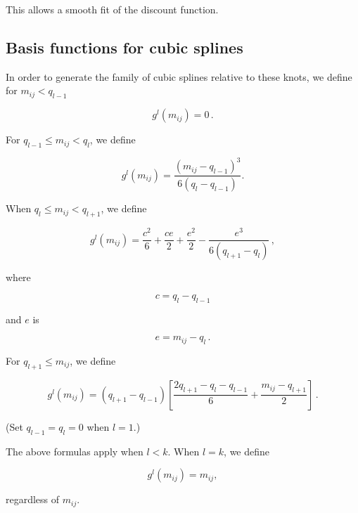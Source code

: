 This allows a smooth fit of the discount function.

\subsection{Basis functions for cubic splines}

In order to generate the family of cubic splines relative to these knots, we define for $m_{ij}<q_{l-1}$

\begin{equation*}
  \label{eq:A.2}
  g^l(m_{ij})=0\,.
\end{equation*}


For $q_{l-1}\leq m_{ij} <q_l$, we define

\begin{equation*}
  \label{eq:A.3}
  g^l(m_{ij})=\frac{(m_{ij}-q_{l-1})^3}{6(q_l-q_{l-1})}.
\end{equation*}

When $q_l\leq m_{ij}< q_{l+1}$, we define

\begin{equation*}
  \label{eq:A.4a}
  g^l(m_{ij}) = \frac{c^2}{6}+\frac{ce}{2}+\frac{e^2}{2}-\frac{e^3}{6(q_{l+1}-q_l)}\,,
\end{equation*}

where

\begin{equation*}
  \label{eq:A.4b}
  c = q_l-q_{l-1}
\end{equation*}

and $e$ is

\begin{equation*}
  \label{eq:A.4c}
  e = m_{ij}-q_l\,.
\end{equation*}

For $q_{l+1}\leq m_{ij}$, we define

\begin{equation*}
  \label{eq:A.5}
  g^l(m_{ij}) = (q_{l+1}-q_{l-1})\left[\frac{2q_{l+1}-q_l-q_{l-1}}{6}+\frac{m_{ij}-q_{l+1}}{2}\right]\,.
\end{equation*}

(Set $q_{l-1}=q_l=0$ when $l=1$.)

The above formulas apply when $l<k$. When $l=k$, we define

\begin{equation*}
  \label{eq:A.6}
 g^l(m_{ij})= m_{ij},
\end{equation*}

regardless of $m_{ij}$.

